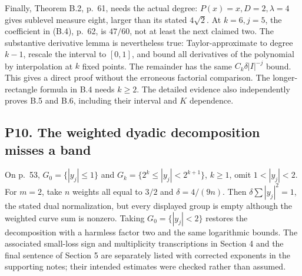 \documentclass[10pt]{article}
\begin{document}
Finally, Theorem B.2, p. 61, needs the actual degree: \(P(x)=x,D=2,\lambda=4\) gives sublevel measure eight, larger than its stated \(4\sqrt2\). At \(k=6,j=5\), the coefficient in (B.4), p. 62, is \(47/60\), not at least the next claimed two. The substantive derivative lemma is nevertheless true: Taylor-approximate to degree \(k-1\), rescale the interval to \([0,1]\), and bound all derivatives of the polynomial by interpolation at \(k\) fixed points. The remainder has the same \(C_k\delta|I|^{-j}\) bound. This gives a direct proof without the erroneous factorial comparison. The longer-rectangle formula in B.4 needs \(k\ge2\). The detailed evidence also independently proves B.5 and B.6, including their interval and \(K\) dependence.\par
\subsection*{P10. The weighted dyadic decomposition misses a band}
On p. 53, \(G_0=\{|y_j|\le1\}\) and \(G_k=\{2^k\le|y_j|<2^{k+1}\}\), \(k\ge1\), omit \(1<|y_j|<2\). For \(m=2\), take \(n\) weights all equal to \(3/2\) and \(\delta=4/(9n)\). Then \(\delta\sum|y_j|^2=1\), the stated dual normalization, but every displayed group is empty although the weighted curve sum is nonzero. Taking \(G_0=\{|y_j|<2\}\) restores the decomposition with a harmless factor two and the same logarithmic bounds. The associated small-loss sign and multiplicity transcriptions in Section 4 and the final sentence of Section 5 are separately listed with corrected exponents in the supporting notes; their intended estimates were checked rather than assumed.\par
\end{document}
